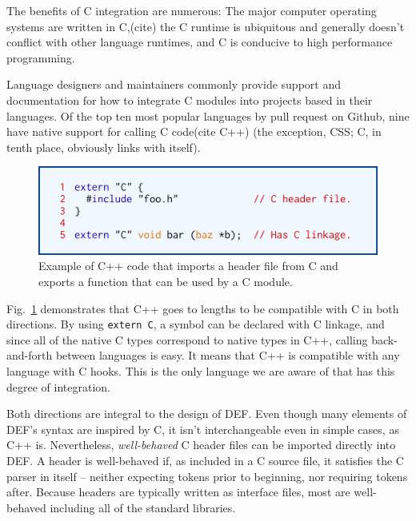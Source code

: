 The benefits of C integration are numerous: The major computer operating systems are written in C,(cite) the C runtime is ubiquitous and generally doesn't conflict with other language runtimes, and C is conducive to high performance programming.

Language designers and maintainers commonly provide support and documentation for how to integrate C modules into projects based in their languages.  Of the top ten most popular languages by pull request on Github\cite{Octoverse}, nine have native support for calling C code\cite{JavascriptCiface, PythonCiface, JavaCiface, RubyCiface, PHPCiface, DotNetCiface, GoCiface}(cite C++) (the exception, CSS; C, in tenth place, obviously links with itself).

\begin{figure}[htbp!]
        \centering
        \includegraphics[scale=0.25]{gfx/extern}
        \caption{Example of C++ code that imports a header file from C and exports a function that can be used by a C module.}
        \label{fig:extern-example}
\end{figure}

Fig.~\ref{fig:extern-example} demonstrates that C++ goes to lengths to be compatible with C in both directions.  By using \texttt{extern \textquotedbl{}C\textquotedbl{}}, a symbol can be declared with C linkage, and since all of the native C types correspond to native types in C++, calling back-and-forth between languages is easy.  It means that C++ is compatible with any language with C hooks.  This is the only language we are aware of that has this degree of integration.

Both directions are integral to the design of DEF.  Even though many elements of DEF's syntax are inspired by C, it isn't interchangeable even in simple cases, as C++ is.  Nevertheless, \textit{well-behaved} C header files can be imported directly into DEF.  A header is well-behaved if, as included in a C source file, it satisfies the C parser in itself -- neither expecting tokens prior to beginning, nor requiring tokens after.  Because headers are typically written as interface files, most are well-behaved including all of the standard libraries.
